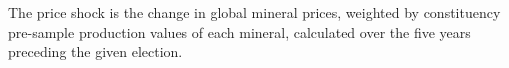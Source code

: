 The price shock is the change in global mineral prices, weighted by
constituency pre-sample production values of each mineral, calculated
over the five years preceding the given election.%
